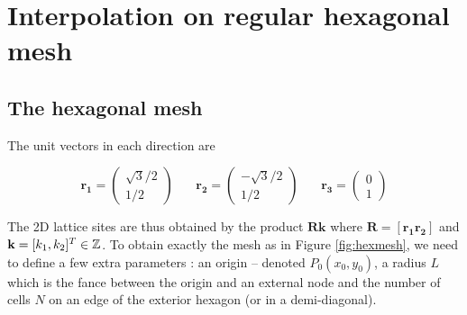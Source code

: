 \documentclass[proc]{edpsmath}
\begin{document}
\section{Interpolation on regular hexagonal mesh}
\subsection{The hexagonal mesh}

The unit vectors in each direction are

\begin{equation}
	\mathbf{r_1} = \begin{pmatrix}\sqrt{3}/2 \\  1/2
		\end{pmatrix} ~~~~~~~~
	\mathbf{r_2} = \begin{pmatrix}-\sqrt{3}/2 \\ 1/2
		\end{pmatrix} ~~~~~~~~
	\mathbf{r_3} = \begin{pmatrix} 0 \\ 1
		\end{pmatrix}
\end{equation}

The 2D lattice sites are thus obtained by the product $\mathbf{Rk}$ where $\mathbf{R} = [\mathbf{r_1 r_2}]$ and $\mathbf{k} = [k_1, k_2]^T \in \mathbb{Z}$.  To obtain exactly the mesh as in Figure \ref{fig:hexmesh}, we need to define a few extra parameters : an origin -- denoted $P_0(x_0, y_0)$, a radius $L$ which is the fance between the origin and an external node and the number of cells $N$ on an edge of the exterior hexagon (or in a demi-diagonal).
\end{document}
